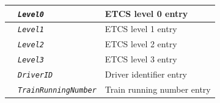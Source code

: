 \documentclass{template/openetcs}
\begin{document}
\begin{itemize}
\begin{longtable}{|l|l|l|}
			&	\begin{minipage}[t]{0.40\linewidth} \emph{\texttt{Level0}} \end{minipage}
			&	\begin{minipage}[t]{0.38\linewidth} ETCS level 0 entry \end{minipage} \\
			
			\hline
			
			&	\begin{minipage}[t]{0.40\linewidth} \emph{\texttt{Level1}} \end{minipage}
			&	\begin{minipage}[t]{0.38\linewidth} ETCS level 1 entry \end{minipage} \\
			
			\hline
			
			&	\begin{minipage}[t]{0.40\linewidth} \emph{\texttt{Level2}} \end{minipage}
			&	\begin{minipage}[t]{0.38\linewidth} ETCS level 2 entry \end{minipage} \\
			
			\hline
			
			&	\begin{minipage}[t]{0.40\linewidth} \emph{\texttt{Level3}} \end{minipage}
			&	\begin{minipage}[t]{0.38\linewidth} ETCS level 3 entry \end{minipage} \\ 
			
			\hline
			
			&	\begin{minipage}[t]{0.40\linewidth} \emph{\texttt{DriverID}} \end{minipage}
			&	\begin{minipage}[t]{0.38\linewidth} Driver identifier entry \end{minipage} \\
			
			\hline
			
			&	\begin{minipage}[t]{0.40\linewidth} \emph{\texttt{TrainRunningNumber}} \end{minipage}
			&	\begin{minipage}[t]{0.38\linewidth} Train running number entry \end{minipage} \\
			

\end{longtable}
\end{itemize}
\end{document}
